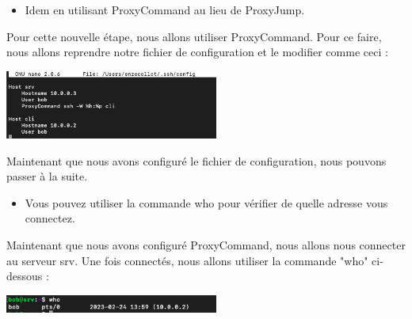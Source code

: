 \documentclass[12pt]{article}
\begin{document}
\vspace{0.3cm}

\begin{itemize}
  \item Idem en utilisant ProxyCommand au lieu de ProxyJump.
\end{itemize}

\vspace{0.3cm}

Pour cette nouvelle étape, nous allons utiliser ProxyCommand. Pour ce faire, nous allons reprendre notre fichier de configuration et le modifier comme ceci :

\vspace{0.3cm}

\begin{center}
  \includegraphics[width=7cm]{Images-Client-SSH/Image-TD-SSH-8/ProxyCommand.png}
\end{center}

\vspace{0.3cm}

Maintenant que nous avons configuré le fichier de configuration, nous pouvons passer à la suite.

\vspace{0.3cm}

\begin{itemize}
  \item Vous pouvez utiliser la commande who pour vérifier de quelle adresse vous connectez.
\end{itemize}

\vspace{0.3cm}

Maintenant que nous avons configuré ProxyCommand, nous allons nous connecter au serveur srv. Une fois connectés, nous allons utiliser la commande "who" ci-dessous :

\vspace{0.3cm}

\begin{center}
  \includegraphics[width=7cm]{Images-Client-SSH/Image-TD-SSH-8/commande-who-2.png}
\end{center}
\end{document}
